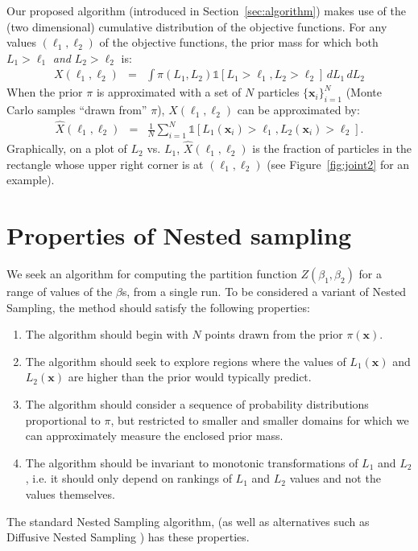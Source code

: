 \documentclass[journal,article,accept,moreauthors,pdftex,12pt,a4paper]{mdpi}
\newcommand{\xx}{\boldsymbol{x}}
\begin{document}
Our proposed algorithm (introduced in Section~\ref{sec:algorithm}) makes use
of the (two dimensional) cumulative distribution of the objective functions.
For any values $(\ell_1, \ell_2)$ of the objective functions,
the prior mass for which both $L_1 > \ell_1$ {\em and} $L_2 > \ell_2$ is:
\begin{eqnarray}
X(\ell_1, \ell_2) &=& \int \pi(L_1, L_2)
\mathds{1}\left[L_1 > \ell_1, L_2 > \ell_2 \right]
 \, dL_1 \, dL_2
\end{eqnarray}
When the prior $\pi$ is approximated with a set of $N$
particles $\{\xx_i\}_{i=1}^N$
(Monte Carlo samples ``drawn from'' $\pi$),
$X(\ell_1, \ell_2)$ can be approximated by:
\begin{eqnarray}
\hat{X}(\ell_1, \ell_2) &=&
\frac{1}{N}
\sum_{i=1}^N \mathds{1}\left[L_1(\xx_i) > \ell_1,
L_2(\xx_i) > \ell_2\right].\label{eqn:corner_count}
\end{eqnarray}
Graphically, on a plot of $L_2$ vs. $L_1$, $\hat{X}(\ell_1, \ell_2)$
is the fraction of particles in the rectangle whose upper right corner is at
$\left(\ell_1, \ell_2\right)$ (see Figure~\ref{fig:joint2} for an
example).

\section{Properties of Nested sampling}

We seek an algorithm for computing the partition function
$Z(\beta_1, \beta_2)$ for a range of values of the $\beta$s, from a single
run. To be considered a variant of Nested Sampling, the method should satisfy
the following properties:
\begin{enumerate}
\item The algorithm should begin with $N$ points drawn from the prior $\pi(\xx)$.
\item The algorithm should seek to explore regions where the values of
$L_1(\xx)$ and $L_2(\xx)$ are higher than the prior would typically predict.
\item The algorithm should consider a sequence of probability
distributions proportional to $\pi$, but restricted to smaller and smaller
domains for which we can approximately measure the enclosed prior mass.
\item The algorithm should be invariant to monotonic transformations of
$L_1$ and $L_2$, i.e. it should only depend on rankings of $L_1$ and $L_2$
values and not the values themselves.
\end{enumerate}
The standard Nested Sampling algorithm, (as well as alternatives such as
Diffusive Nested Sampling \citep{dnest}) has these properties.
\end{document}
